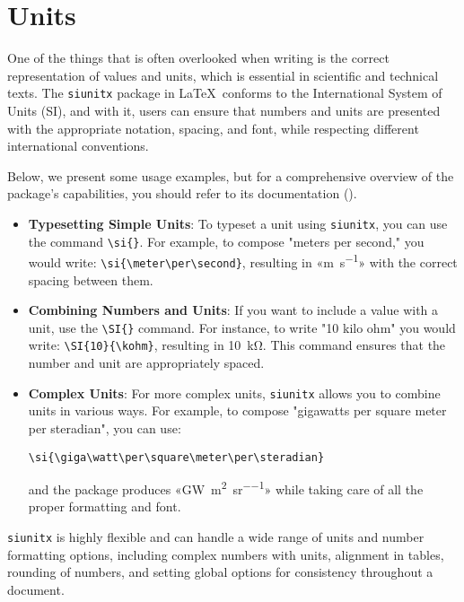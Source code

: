 \else
  \section{Units}
  
  One of the things that is often overlooked when writing is the correct representation of values and units, which is essential in scientific and technical texts. The \texttt{siunitx} package in \LaTeX\ conforms to the International System of Units (SI), and with it, users can ensure that numbers and units are presented with the appropriate notation, spacing, and font, while respecting different international conventions.

  Below, we present some usage examples, but for a comprehensive overview of the package's capabilities, you should refer to its documentation (\cite{siunitx}).

  \begin{itemize}
    \item \textbf{Typesetting Simple Units}: To typeset a unit using \texttt{siunitx}, you can use the command \verb|\si{}|. For example, to compose "meters per second," you would write: \verb|\si{\meter\per\second}|, resulting in «\si{\meter\per\second}» with the correct spacing between them.

    \item \textbf{Combining Numbers and Units}: If you want to include a value with a unit, use the \verb|\SI{}| command. For instance, to write "10 kilo ohm" you would write: \verb|\SI{10}{\kohm}|, resulting in \SI{10}{\kohm}. This command ensures that the number and unit are appropriately spaced.

    \item \textbf{Complex Units}: For more complex units, \texttt{siunitx} allows you to combine units in various ways. For example, to compose "gigawatts per square meter per steradian", you can use: 
    
    \verb|\si{\giga\watt\per\square\meter\per\steradian}|
    
    and the package produces «\si{\giga\watt\per\square\meter\per\steradian}» while taking care of all the proper formatting and font.
  \end{itemize}

  \texttt{siunitx} is highly flexible and can handle a wide range of units and number formatting options, including complex numbers with units, alignment in tables, rounding of numbers, and setting global options for consistency throughout a document.
\fi